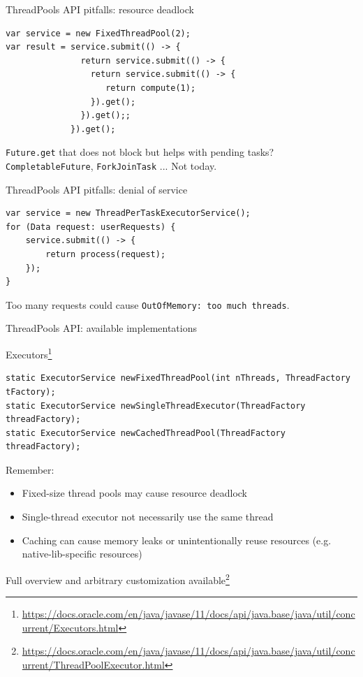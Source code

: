 \begin{frame}[t,fragile]{ThreadPools API pitfalls: resource deadlock}

\begin{verbatim}
var service = new FixedThreadPool(2);
var result = service.submit(() -> {
               return service.submit(() -> {
                 return service.submit(() -> {
                    return compute(1);
                 }).get();
               }).get();;
             }).get();
\end{verbatim}

\newline
\pause \texttt{Future.get} that does not block but helps with pending tasks? 
\newline
\pause \texttt{CompletableFuture}, \texttt{ForkJoinTask} ... \pause Not today.

\end{frame}


\begin{frame}[t,fragile]{ThreadPools API pitfalls: denial of service}

\begin{verbatim}
var service = new ThreadPerTaskExecutorService();
for (Data request: userRequests) {
    service.submit(() -> {
        return process(request);
    });
}
\end{verbatim}

\pause
Too many requests could cause \texttt{OutOfMemory: too much threads}.

\end{frame}

\begin{frame}[fragile]{ThreadPools API: available implementations}

Executors\footnote{\tiny\url{https://docs.oracle.com/en/java/javase/11/docs/api/java.base/java/util/concurrent/Executors.html}}

\begin{verbatim}
static ExecutorService newFixedThreadPool(int nThreads, ThreadFactory tFactory);
static ExecutorService newSingleThreadExecutor(ThreadFactory threadFactory);
static ExecutorService newCachedThreadPool(ThreadFactory threadFactory);
\end{verbatim}

\pause

Remember:
\begin{itemize}
    \item Fixed-size thread pools may cause resource deadlock
    \item Single-thread executor not necessarily use the same thread
    \item Caching can cause memory leaks or unintentionally reuse resources (e.g. native-lib-specific resources)
\end{itemize}

Full overview and arbitrary customization available\footnote<2->{\tiny\url{https://docs.oracle.com/en/java/javase/11/docs/api/java.base/java/util/concurrent/ThreadPoolExecutor.html}}

\end{frame}

